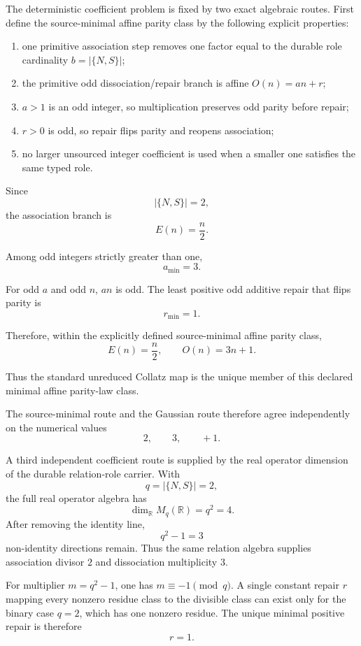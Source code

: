 \documentclass[11pt]{article}
\begin{document}
The deterministic coefficient problem is fixed by two exact algebraic routes.
First define the source-minimal affine parity class by the following explicit
properties:

\begin{enumerate}
\item one primitive association step removes one factor equal to the durable
      role cardinality \(b=|\{N,S\}|\);
\item the primitive odd dissociation/repair branch is affine
      \(O(n)=an+r\);
\item \(a>1\) is an odd integer, so multiplication preserves odd parity before
      repair;
\item \(r>0\) is odd, so repair flips parity and reopens association;
\item no larger unsourced integer coefficient is used when a smaller one
      satisfies the same typed role.
\end{enumerate}

Since
\[
|\{N,S\}|=2,
\]
the association branch is
\[
\boxed{
E(n)=\frac n2.
}
\]

Among odd integers strictly greater than one,
\[
\boxed{
a_{\min}=3.
}
\]

For odd \(a\) and odd \(n\), \(an\) is odd. The least positive odd additive
repair that flips parity is
\[
\boxed{
r_{\min}=1.
}
\]

Therefore, within the explicitly defined source-minimal affine parity class,
\[
\boxed{
E(n)=\frac n2,
\qquad
O(n)=3n+1.
}
\]

Thus the standard unreduced Collatz map is the unique member of this declared
minimal affine parity-law class.

The source-minimal route and the Gaussian route therefore agree independently
on the numerical values
\[
\boxed{
2,\qquad3,\qquad+1.
}
\]

A third independent coefficient route is supplied by the real operator
dimension of the durable relation-role carrier. With
\[
q=|\{N,S\}|=2,
\]
the full real operator algebra has
\[
\dim_{\mathbb R}M_q(\mathbb R)=q^2=4.
\]
After removing the identity line,
\[
\boxed{
q^2-1=3
}
\]
non-identity directions remain. Thus the same relation algebra supplies
association divisor \(2\) and dissociation multiplicity \(3\).

For multiplier \(m=q^2-1\), one has \(m\equiv-1\pmod q\). A single constant
repair \(r\) mapping every nonzero residue class to the divisible class can
exist only for the binary case \(q=2\), which has one nonzero residue. The
unique minimal positive repair is therefore
\[
\boxed{r=1.}
\]
\end{document}
